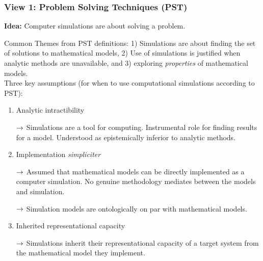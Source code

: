 \subsubsection{View 1: Problem Solving Techniques (PST)}

{\bf Idea:} Computer simulations are about solving a problem. \\




Common Themes from PST definitions: 1) Simulations are about finding the set of solutions to mathematical models, 2) Use of simulations is justified when analytic methods are unavailable, and 3) exploring {\it properties} of mathematical models. \\



Three key assumptions (for when to use computational simulations according to PST):
\begin{enumerate}
	\item Analytic intractibility

	$\rightarrow$ Simulations are a tool for computing. Instrumental role for finding results for a model. Understood as epistemically inferior to analytic methods.

	\item Implementation {\it simpliciter}

	$\rightarrow$ Assumed that mathematical models can be directly implemented as a computer simulation. No genuine methodology mediates between the models and simulation.

	$\rightarrow$ Simulation models are ontologically on par with mathematical models.

	\item Inherited representational capacity

	$\rightarrow$ Simulations inherit their representational capacity of a target system from the mathematical model they implement.
\end{enumerate}

